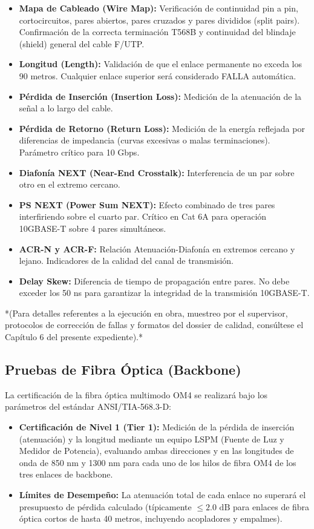 \begin{itemize}
    \item \textbf{Mapa de Cableado (Wire Map):} Verificación de continuidad pin a pin, cortocircuitos, pares abiertos, pares cruzados y pares divididos (split pairs). Confirmación de la correcta terminación T568B y continuidad del blindaje (shield) general del cable F/UTP.
    \item \textbf{Longitud (Length):} Validación de que el enlace permanente no exceda los 90 metros. Cualquier enlace superior será considerado FALLA automática.
    \item \textbf{Pérdida de Inserción (Insertion Loss):} Medición de la atenuación de la señal a lo largo del cable.
    \item \textbf{Pérdida de Retorno (Return Loss):} Medición de la energía reflejada por diferencias de impedancia (curvas excesivas o malas terminaciones). Parámetro crítico para 10 Gbps.
    \item \textbf{Diafonía NEXT (Near-End Crosstalk):} Interferencia de un par sobre otro en el extremo cercano.
    \item \textbf{PS NEXT (Power Sum NEXT):} Efecto combinado de tres pares interfiriendo sobre el cuarto par. Crítico en Cat 6A para operación 10GBASE-T sobre 4 pares simultáneos.
    \item \textbf{ACR-N y ACR-F:} Relación Atenuación-Diafonía en extremos cercano y lejano. Indicadores de la calidad del canal de transmisión.
    \item \textbf{Delay Skew:} Diferencia de tiempo de propagación entre pares. No debe exceder los 50 ns para garantizar la integridad de la transmisión 10GBASE-T.
\end{itemize}

*(Para detalles referentes a la ejecución en obra, muestreo por el supervisor, protocolos de corrección de fallas y formatos del dossier de calidad, consúltese el Capítulo 6 del presente expediente).*

\subsection*{Pruebas de Fibra Óptica (Backbone)}

La certificación de la fibra óptica multimodo OM4 se realizará bajo los parámetros del estándar ANSI/TIA-568.3-D:
\begin{itemize}
    \item \textbf{Certificación de Nivel 1 (Tier 1):} Medición de la pérdida de inserción (atenuación) y la longitud mediante un equipo LSPM (Fuente de Luz y Medidor de Potencia), evaluando ambas direcciones y en las longitudes de onda de 850 nm y 1300 nm para cada uno de los hilos de fibra OM4 de los tres enlaces de backbone.
    \item \textbf{Límites de Desempeño:} La atenuación total de cada enlace no superará el presupuesto de pérdida calculado (típicamente $\le 2.0\text{ dB}$ para enlaces de fibra óptica cortos de hasta 40 metros, incluyendo acopladores y empalmes).
\end{itemize}

